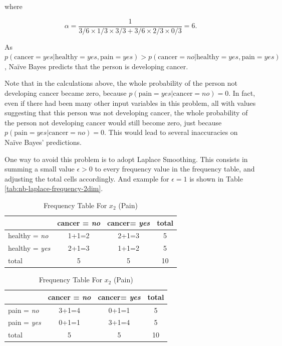 \noindent where 

\[\alpha = \frac{1}{3/6 \times 1/3 \times 3/3 + 3/6 \times 2/3 \times 0/3} = 6. \]

\vspace{0.5cm}
As $p(\text{cancer} = \textit{yes}| \text{healthy} = \textit{yes}, \text{pain} = \textit{yes})  > p(\text{cancer} = \textit{no}| \text{healthy} = \textit{yes}, \text{pain} = \textit{yes})$, Na\"{i}ve Bayes predicts that the person is developing cancer.

Note that in the calculations above, the whole probability of the person not developing cancer became zero, because $p(\text{pain} = \textit{yes} | \text{cancer} = \textit{no}) = 0$. In fact, even if there had been many other input variables in this problem, all with values suggesting that this person was not developing cancer, the whole probability of the person not developing cancer would still become zero, just because $p(\text{pain} = yes | \text{cancer} = \textit{no}) = 0$. This would lead to several inaccuracies on Na\"{i}ve Bayes' predictions. 

One way to avoid this problem is to adopt Laplace Smoothing. This consists in summing a small value $\epsilon > 0$ to every frequency value in the frequency table, and adjusting the total cells accordingly. And example for $\epsilon = 1$  is shown in Table \ref{tab:nb-laplace-frequency-2dim}.

\begin{table}[ht]
\centering
\caption{An Illustrative Frequency Table With Laplace Smoothing For The Two Input Variable Dataset From Table \ref{tab:dataset-2dim}} \label{tab:nb-laplace-frequency-2dim}
\begin{subtable}[h]{0.49\textwidth}
\caption{Frequency Table For $x_1$ (Healthy)} \label{tab:nb-laplace-frequency-2dim-healthy}
\begin{tabular}{|l|c|c|c|} \hline
 & cancer = \textit{no} & cancer= \textit{yes} & total \\ \hline
healthy = \textit{no} & 1+1=2 & 2+1=3 & 5 \\ \hline
healthy = \textit{yes} & 2+1=3 & 1+1=2 & 5 \\ \hline
total & 5 & 5 & 10 \\ \hline
\end{tabular}
\end{subtable}
\vspace{0.5cm}

\begin{subtable}[h]{0.49\textwidth}
\caption{Frequency Table For $x_2$ (Pain)}
\begin{tabular}{|l|c|c|c|} \hline
 & cancer = \textit{no} & cancer= \textit{yes} & total \\ \hline
pain = \textit{no} & 3+1=4 & 0+1=1 & 5 \\ \hline
pain = \textit{yes} & 0+1=1 & 3+1=4 & 5 \\ \hline
total & 5 & 5 & 10 \\ \hline
\end{tabular}
\end{subtable}
\end{table}

